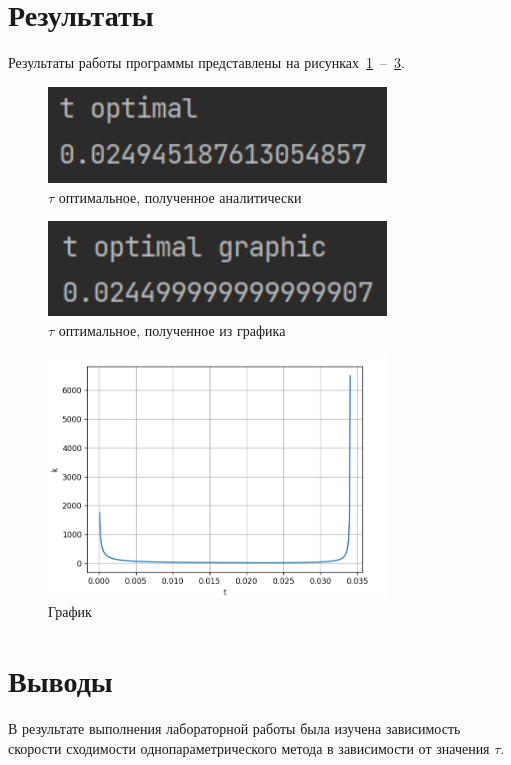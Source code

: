 \documentclass[a4paper, 14pt]{extarticle}
\begin{document}
\section{Результаты}\label{Sect::res}

Результаты работы программы представлены на рисунках~\ref{fig:img1}~--~\ref{fig:img3}.

\begin{figure}[!htb]
	\centering
	\includegraphics[width=0.8\textwidth]{img1}
\caption{$\tau$ оптимальное, полученное аналитически}
\label{fig:img1}
\end{figure}

\begin{figure}[!htb]
	\centering
	\includegraphics[width=0.8\textwidth]{img2}
\caption{$\tau$ оптимальное, полученное из графика}
\label{fig:img2}
\end{figure}

\begin{figure}[!htb]
	\centering
	\includegraphics[width=0.8\textwidth]{img3}
\caption{График}
\label{fig:img3}
\end{figure}

\section{Выводы}\label{Sect::conclusion}

В результате выполнения лабораторной работы была изучена зависимость скорости сходимости однопараметрического метода в зависимости от значения $\tau$.
\end{document}

